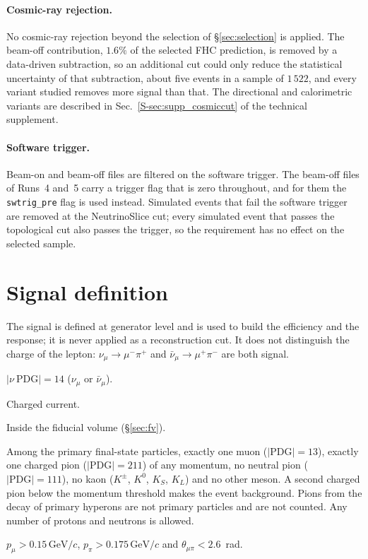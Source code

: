 \documentclass[11pt,a4paper]{article}
\newcommand{\GeVc}{\,\text{GeV}\!/c}
\newcommand{\suppref}[2]{#1~\ref{S-#2} of the technical supplement}
\begin{document}
\paragraph{Cosmic-ray rejection.} No cosmic-ray rejection beyond the selection of
\S\ref{sec:selection} is applied. The beam-off contribution, $1.6\%$ of the selected FHC
prediction, is removed by a data-driven subtraction, so an additional cut could only reduce the
statistical uncertainty of that subtraction, about five events in a sample of $1\,522$, and every
variant studied removes more signal than that. The directional and calorimetric variants are
described in \suppref{Sec.}{sec:supp_cosmiccut}.

\paragraph{Software trigger.}
Beam-on and beam-off files are filtered on the software trigger. The beam-off files of Runs~4 and~5
carry a trigger flag that is zero throughout, and for them the \texttt{swtrig\_pre} flag is used
instead. Simulated events that fail the software trigger are removed at the
NeutrinoSlice cut; every simulated event that passes the topological cut also passes the trigger,
so the requirement has no effect on the selected sample.


\section{Signal definition}
\label{sec:signal}

The signal is defined at generator level and is used to build the efficiency and the response;
it is never applied as a reconstruction cut. It does not distinguish the charge of the lepton:
$\nu_\mu \to \mu^- \pi^+$ and $\bar{\nu}_\mu \to \mu^+ \pi^-$ are both signal.

\begin{description}[style=nextline]
  \item[Neutrino flavour]
    $|\nu~\mathrm{PDG}| = 14$ ($\nu_\mu$ or $\bar{\nu}_\mu$).
  \item[Interaction type]
    Charged current.
  \item[True vertex]
    Inside the fiducial volume (\S\ref{sec:fv}).
  \item[Primary multiplicity]
    Among the primary final-state particles, exactly one muon ($|\mathrm{PDG}| = 13$), exactly one
    charged pion ($|\mathrm{PDG}| = 211$) of any momentum, no neutral pion ($|\mathrm{PDG}| = 111$),
    no kaon ($K^\pm$, $K^0$, $K_S$, $K_L$) and no other meson. A second charged pion below the
    momentum threshold makes the event background. Pions from the decay of primary hyperons are not
    primary particles and are not counted. Any number of protons and neutrons is allowed.
  \item[Kinematic thresholds]
    $p_\mu > 0.15\GeVc$, $p_\pi > 0.175\GeVc$ and $\theta_{\mu\pi} < 2.6$~rad.
\end{description}
\end{document}
